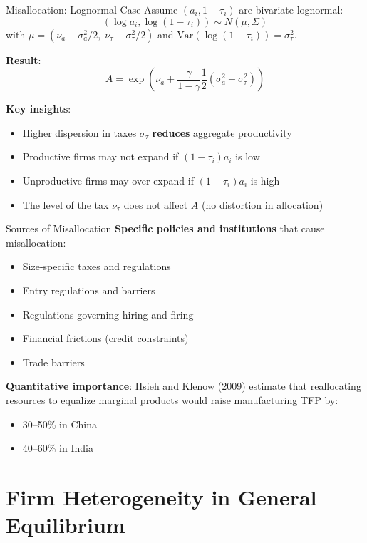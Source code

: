 \documentclass[blue]{beamer}
\begin{document}
\begin{frame}{Misallocation: Lognormal Case}
	Assume $(a_i, 1-\tau_i)$ are bivariate lognormal:
	\[
	(\log a_i, \log(1-\tau_i)) \sim N(\mu, \Sigma)
	\]
	with $\mu = (\nu_a - \sigma_a^2/2, \; \nu_\tau - \sigma_\tau^2/2)$ and $\text{Var}(\log(1-\tau_i)) = \sigma_\tau^2$.
	
	\bigskip
	\textbf{Result}:
	\[
	{A = \exp\left( \nu_a + \frac{\gamma}{1-\gamma} \frac{1}{2}(\sigma_a^2 - \sigma_\tau^2) \right)}
	\]
	
	\bigskip
	\textbf{Key insights}:
	\begin{itemize}
		\item Higher dispersion in taxes $\sigma_\tau$ \textbf{reduces} aggregate productivity
		\item Productive firms may not expand if $(1-\tau_i) a_i$ is low
		\item Unproductive firms may over-expand if $(1-\tau_i) a_i$ is high
		\item The {level} of the tax $\nu_\tau$ does not affect $A$ (no distortion in allocation)
	\end{itemize}
\end{frame}

\begin{frame}{Sources of Misallocation}
	\textbf{Specific policies and institutions} that cause misallocation:
	\begin{itemize}
		\item Size-specific taxes and regulations
		\item Entry regulations and barriers
		\item Regulations governing hiring and firing
		\item Financial frictions (credit constraints)
		\item Trade barriers
	\end{itemize}
	
	\bigskip
	\textbf{Quantitative importance}: Hsieh and Klenow (2009) estimate that reallocating resources to equalize marginal products would raise manufacturing TFP by:
	\begin{itemize}
		\item 30--50\% in China
		\item 40--60\% in India
	\end{itemize}
\end{frame}


\section{Firm Heterogeneity in General Equilibrium}
\end{document}
